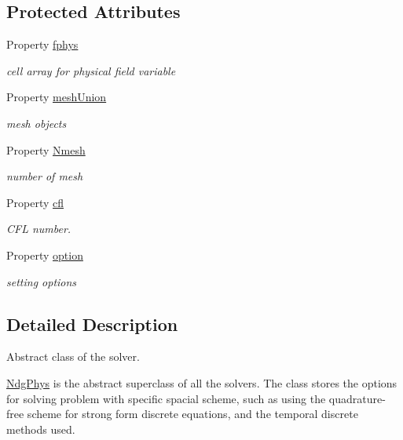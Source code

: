 \subsection*{Protected Attributes}
\begin{DoxyCompactItemize}
\item 
Property \hyperlink{class_ndg_phys_a6b25724fc9474d32018439009072f0a9}{fphys}
\begin{DoxyCompactList}\small\item\em cell array for physical field variable \end{DoxyCompactList}\item 
Property \hyperlink{class_ndg_phys_a31e46a8daf1336f05513eab0df90fbe0}{mesh\+Union}
\begin{DoxyCompactList}\small\item\em mesh objects \end{DoxyCompactList}\item 
Property \hyperlink{class_ndg_phys_a3b7520de4ac26ad66df9cd1fba24e476}{Nmesh}
\begin{DoxyCompactList}\small\item\em number of mesh \end{DoxyCompactList}\item 
Property \hyperlink{class_ndg_phys_ac5e62c74147dd10d3ef6088c2fade574}{cfl}
\begin{DoxyCompactList}\small\item\em C\+FL number. \end{DoxyCompactList}\item 
Property \hyperlink{class_ndg_phys_af91f4c54b93504e76b38a5693774dff1}{option}
\begin{DoxyCompactList}\small\item\em setting options \end{DoxyCompactList}\end{DoxyCompactItemize}


\subsection{Detailed Description}
Abstract class of the solver. 

\hyperlink{class_ndg_phys}{Ndg\+Phys} is the abstract superclass of all the solvers. The class stores the options for solving problem with specific spacial scheme, such as using the quadrature-\/free scheme for strong form discrete equations, and the temporal discrete methods used.

